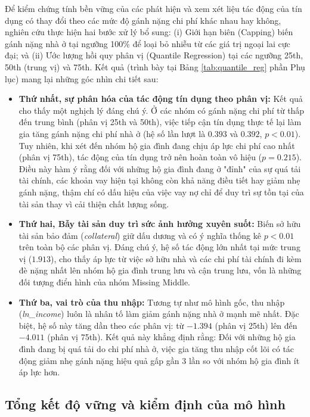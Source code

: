 \documentclass[12pt,a4paper]{report}
\begin{document}
Để kiểm chứng tính bền vững của các phát hiện và xem xét liệu tác động của tín dụng có thay đổi theo các mức độ gánh nặng chi phí khác nhau hay không, nghiên cứu thực hiện hai bước xử lý bổ sung: (i) Giới hạn biên (Capping) biến gánh nặng nhà ở tại ngưỡng 100\% để loại bỏ nhiễu từ các giá trị ngoại lai cực đại; và (ii) Ước lượng hồi quy phân vị (Quantile Regression) tại các ngưỡng 25th, 50th (trung vị) và 75th. Kết quả (trình bày tại Bảng \ref{tab:quantile_reg} phần Phụ lục) mang lại những góc nhìn chi tiết sau:

\begin{itemize}
	\item \textbf{Thứ nhất, sự phân hóa của tác động tín dụng theo phân vị:} Kết quả cho thấy một nghịch lý đáng chú ý. Ở các nhóm có gánh nặng chi phí từ thấp đến trung bình (phân vị 25th và 50th), việc tiếp cận tín dụng thực tế lại làm gia tăng gánh nặng chi phí nhà ở (hệ số lần lượt là $0.393$ và $0.392$, $p < 0.01$). Tuy nhiên, khi xét đến nhóm hộ gia đình đang chịu áp lực chi phí cao nhất (phân vị 75th), tác động của tín dụng trở nên hoàn toàn vô hiệu ($p = 0.215$). Điều này hàm ý rằng đối với những hộ gia đình đang ở "đỉnh" của sự quá tải tài chính, các khoản vay hiện tại không còn khả năng điều tiết hay giảm nhẹ gánh nặng, thậm chí có dấu hiệu của việc vay nợ chỉ để duy trì sự tồn tại của tài sản thay vì cải thiện chất lượng sống.
	
	\item \textbf{Thứ hai, Bẫy tài sản duy trì sức ảnh hưởng xuyên suốt:} Biến sở hữu tài sản bảo đảm (\textit{collateral}) giữ dấu dương và có ý nghĩa thống kê $p < 0.01$ trên toàn bộ các phân vị. Đáng chú ý, hệ số tác động lớn nhất tại mức trung vị ($1.913$), cho thấy áp lực từ việc sở hữu nhà và các chi phí tài chính đi kèm đè nặng nhất lên nhóm hộ gia đình trung lưu và cận trung lưu, vốn là những đối tượng điển hình của nhóm Missing Middle.
	
	\item \textbf{Thứ ba, vai trò của thu nhập:} Tương tự như mô hình gốc, thu nhập (\textit{ln\_income}) luôn là nhân tố làm giảm gánh nặng nhà ở mạnh mẽ nhất. Đặc biệt, hệ số này tăng dần theo các phân vị: từ $-1.394$ (phân vị 25th) lên đến $-4.011$ (phân vị 75th). Kết quả này khẳng định rằng: Đối với những hộ gia đình đang bị quá tải do chi phí nhà ở, việc gia tăng thu nhập cốt lõi có tác động giảm nhẹ gánh nặng hiệu quả gấp gần 3 lần so với nhóm hộ gia đình ít áp lực hơn.
\end{itemize}

\subsection{Tổng kết độ vững và kiểm định của mô hình}
\end{document}
